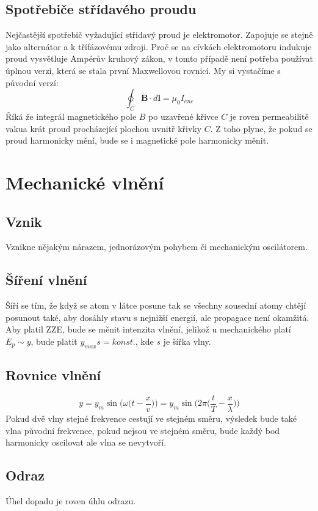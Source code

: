 \documentclass[titlepage]{report}
\begin{document}
\section{Spotřebiče střídavého proudu}
Nejčastější spotřebič vyžadující střidavý proud je elektromotor. Zapojuje se stejně jako alternátor a k třífázovému zdroji. Proč se na cívkách elektromotoru indukuje proud vysvětluje Ampérův kruhový zákon, v tomto případě není potřeba používat úplnou verzi, která se stala první Maxwellovou rovnicí. My si vystačíme s původní verzí:\\
\begin{equation}
\oint_C \boldsymbol B \cdot d \boldsymbol l = \mu_0 I_{enc} 
\end{equation}
Říká že integrál magnetického pole $B$ po uzavřené křivce $C$ je roven permeabilitě vakua krát proud procházející plochou uvnitř křivky $C$. Z toho plyne, že pokud se proud harmonicky mění, bude se i magnetické pole harmonicky měnit.
\chapter{Mechanické vlnění}
\section{Vznik}
Vznikne nějakým nárazem, jednorázovým pohybem či mechanickým oscilátorem.
\section{Šíření vlnění}
Šíří se tím, že když se atom v látce posune tak se všechny sousední atomy chtějí posunout také, aby dosáhly stavu s nejnižší energií, ale propagace není okamžitá.\\
Aby platil ZZE, bude se měnit intenzita vlnění, jelikož u mechanického platí $E_p \sim y$, bude platit $y_{max} s = konst.$, kde $s$ je šířka vlny.
\section{Rovnice vlnění}
\begin{equation}
y = y_m \sin \Big ( \omega \Big ( t - \frac{x}{v} \Big ) \Big ) = y_m \sin \Big ( 2\pi \Big ( \frac{t}{T} - \frac{x}{\lambda} \Big ) \Big )
\end{equation}
Pokud dvě vlny stejné frekvence cestují ve stejném směru, výsledek bude také vlna původní frekvence, pokud nejsou ve stejném směru, bude každý bod harmonicky oscilovat ale vlna se nevytvoří.
\section{Odraz}
Úhel dopadu je roven úhlu odrazu.
\end{document}
